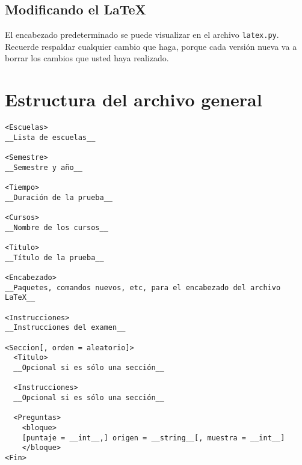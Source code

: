 \documentclass[12pt]{article}
\theoremstyle{definition}
\begin{document}
\subsection{Modificando el \LaTeX}
El encabezado predeterminado se puede visualizar en el archivo \verb|latex.py|. Recuerde respaldar cualquier cambio que haga, porque cada versi\'on nueva va a borrar los cambios que usted haya realizado.

\newpage
\section{Estructura del archivo general}
\begin{verbatim}
<Escuelas>
__Lista de escuelas__

<Semestre>
__Semestre y año__

<Tiempo>
__Duración de la prueba__

<Cursos>
__Nombre de los cursos__

<Titulo>
__Título de la prueba__

<Encabezado>
__Paquetes, comandos nuevos, etc, para el encabezado del archivo LaTeX__

<Instrucciones>
__Instrucciones del examen__

<Seccion[, orden = aleatorio]>
  <Titulo>
  __Opcional si es sólo una sección__

  <Instrucciones>
  __Opcional si es sólo una sección__

  <Preguntas>
    <bloque>
    [puntaje = __int__,] origen = __string__[, muestra = __int__]
    </bloque>
<Fin>
\end{verbatim}
\end{document}
